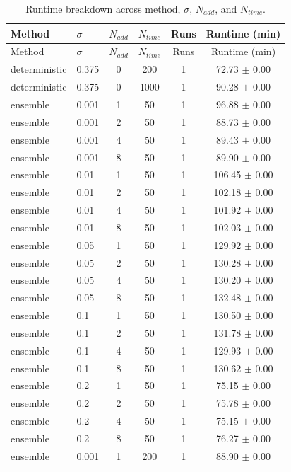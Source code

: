 \begin{longtable}{llcccc}
\caption{Runtime breakdown across method, $\sigma$, $N_{add}$, and $N_{time}$.}\label{tab:runtime_full_breakdown}\\
\toprule
Method & $\sigma$ & $N_{add}$ & $N_{time}$ & Runs & Runtime (min) \\
\midrule
\endfirsthead
\toprule
Method & $\sigma$ & $N_{add}$ & $N_{time}$ & Runs & Runtime (min) \\
\midrule
\endhead
\bottomrule
\endfoot
deterministic & 0.375 & 0 & 200 & 1 & 72.73 $\pm$ 0.00 \\
deterministic & 0.375 & 0 & 1000 & 1 & 90.28 $\pm$ 0.00 \\
ensemble & 0.001 & 1 & 50 & 1 & 96.88 $\pm$ 0.00 \\
ensemble & 0.001 & 2 & 50 & 1 & 88.73 $\pm$ 0.00 \\
ensemble & 0.001 & 4 & 50 & 1 & 89.43 $\pm$ 0.00 \\
ensemble & 0.001 & 8 & 50 & 1 & 89.90 $\pm$ 0.00 \\
ensemble & 0.01 & 1 & 50 & 1 & 106.45 $\pm$ 0.00 \\
ensemble & 0.01 & 2 & 50 & 1 & 102.18 $\pm$ 0.00 \\
ensemble & 0.01 & 4 & 50 & 1 & 101.92 $\pm$ 0.00 \\
ensemble & 0.01 & 8 & 50 & 1 & 102.03 $\pm$ 0.00 \\
ensemble & 0.05 & 1 & 50 & 1 & 129.92 $\pm$ 0.00 \\
ensemble & 0.05 & 2 & 50 & 1 & 130.28 $\pm$ 0.00 \\
ensemble & 0.05 & 4 & 50 & 1 & 130.20 $\pm$ 0.00 \\
ensemble & 0.05 & 8 & 50 & 1 & 132.48 $\pm$ 0.00 \\
ensemble & 0.1 & 1 & 50 & 1 & 130.50 $\pm$ 0.00 \\
ensemble & 0.1 & 2 & 50 & 1 & 131.78 $\pm$ 0.00 \\
ensemble & 0.1 & 4 & 50 & 1 & 129.93 $\pm$ 0.00 \\
ensemble & 0.1 & 8 & 50 & 1 & 130.62 $\pm$ 0.00 \\
ensemble & 0.2 & 1 & 50 & 1 & 75.15 $\pm$ 0.00 \\
ensemble & 0.2 & 2 & 50 & 1 & 75.78 $\pm$ 0.00 \\
ensemble & 0.2 & 4 & 50 & 1 & 75.15 $\pm$ 0.00 \\
ensemble & 0.2 & 8 & 50 & 1 & 76.27 $\pm$ 0.00 \\
ensemble & 0.001 & 1 & 200 & 1 & 88.90 $\pm$ 0.00 \\

\end{longtable}

